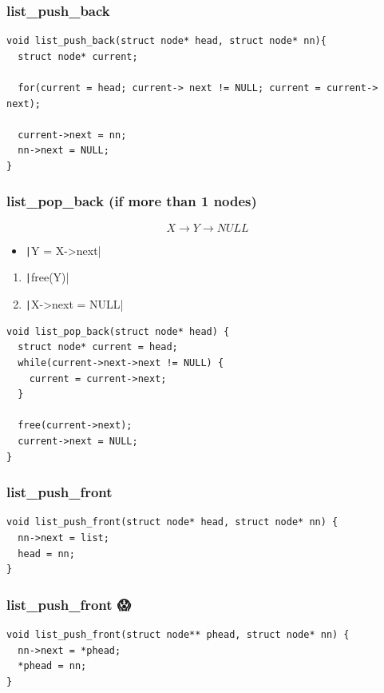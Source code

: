 \documentclass{../c-lecture}
\begin{document}
\begin{frame}[fragile]
  \frametitle{list\_push\_back}
  \begin{verbatim}
void list_push_back(struct node* head, struct node* nn){
  struct node* current;

  for(current = head; current-> next != NULL; current = current-> next);

  current->next = nn;
  nn->next = NULL;
}
  \end{verbatim}
\end{frame}

\begin{frame}[fragile]
  \frametitle{list\_pop\_back (if more than 1 nodes)}
  \[X \rightarrow Y \rightarrow NULL\]
  \begin{itemize}
    \item \texttt|Y = X->next|
  \end{itemize}
  \begin{enumerate}
    \item \texttt|free(Y)|
    \item \texttt|X->next = NULL|
  \end{enumerate}
\end{frame}

\begin{frame}[fragile]
  \begin{verbatim}
void list_pop_back(struct node* head) {
  struct node* current = head;
  while(current->next->next != NULL) {
    current = current->next;
  }

  free(current->next);
  current->next = NULL;
}
  \end{verbatim}
\end{frame}

\begin{frame}[fragile]
  \frametitle{list\_push\_front 🤔}
  \begin{verbatim}
void list_push_front(struct node* head, struct node* nn) {
  nn->next = list;
  head = nn;
}
  \end{verbatim}
\end{frame}

\begin{frame}[fragile]
  \frametitle{list\_push\_front 😱}
  \begin{verbatim}
void list_push_front(struct node** phead, struct node* nn) {
  nn->next = *phead;
  *phead = nn;
}
  \end{verbatim}
\end{frame}
\end{document}
